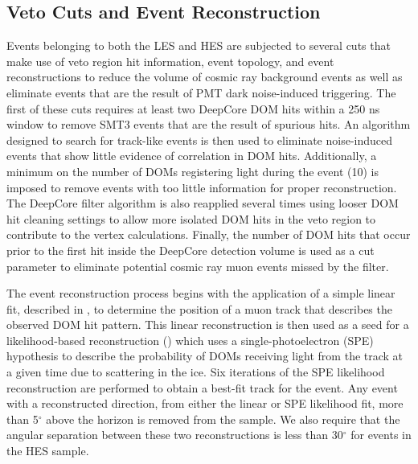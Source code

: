 \documentclass[manuscript]{aastex}
\begin{document}
\subsection{Veto Cuts and Event Reconstruction}
Events belonging to both the LES and HES are subjected to several cuts that make use of veto region hit information, event topology, and event reconstructions to reduce the volume of cosmic ray background events as well as eliminate events that are the result of PMT dark noise-induced triggering. The first of these cuts requires at least two DeepCore DOM hits within a 250 ns window to remove SMT3 events that are the result of spurious hits. An algorithm designed to search for track-like events is then used to eliminate noise-induced events that show little evidence of correlation in DOM hits. Additionally, a minimum on the number of DOMs registering light during the event (10) is imposed to remove events with too little information for proper reconstruction. The DeepCore filter algorithm is also reapplied several times using looser DOM hit cleaning settings to allow more isolated DOM hits in the veto region to contribute to the vertex calculations. Finally, the number of DOM hits that occur prior to the first hit inside the DeepCore detection volume is used as a cut parameter to eliminate potential cosmic ray muon events missed by the filter.

The event reconstruction process begins with the application of a simple linear fit, described in \cite{2014NIMPA.736..143A}, to determine the position of a muon track that describes the observed DOM hit pattern. This linear reconstruction is then used as a seed for a likelihood-based reconstruction (\cite{2004NIMPA.524..169A}) which uses a single-photoelectron (SPE) hypothesis to describe the probability of DOMs receiving light from the track at a given time due to scattering in the ice. Six iterations of the SPE likelihood reconstruction are performed to obtain a best-fit track for the event. Any event with a reconstructed direction, from either the linear or SPE likelihood fit, more than 5$^{\circ}$ above the horizon is removed from the sample. We also require that the angular separation between these two reconstructions is less than 30$^{\circ}$ for events in the HES sample.
\end{document}
